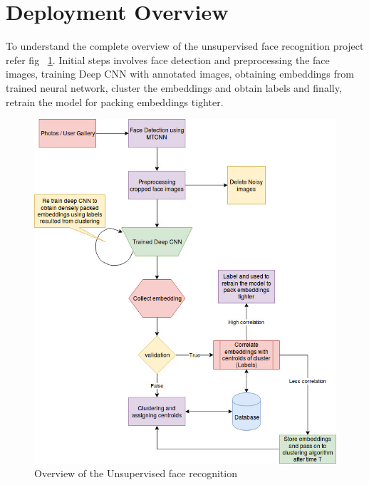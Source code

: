\documentclass[a4paper,12pt, twoside]{NITKReport}
\begin{document}
\section{Deployment Overview}
To understand the complete overview of the unsupervised face recognition project refer fig ~\ref{overview}. Initial steps involves face detection and preprocessing the face images, training Deep CNN with annotated images, obtaining embeddings from trained neural network, cluster the embeddings and obtain labels and finally, retrain the model for packing embeddings tighter.

\begin{figure} [h]
    \includegraphics[height=\textheight,width=\textwidth]{overview.jpg}
    \caption{Overview of the Unsupervised face recognition}
    \label{overview}
\end{figure}
\end{document}
